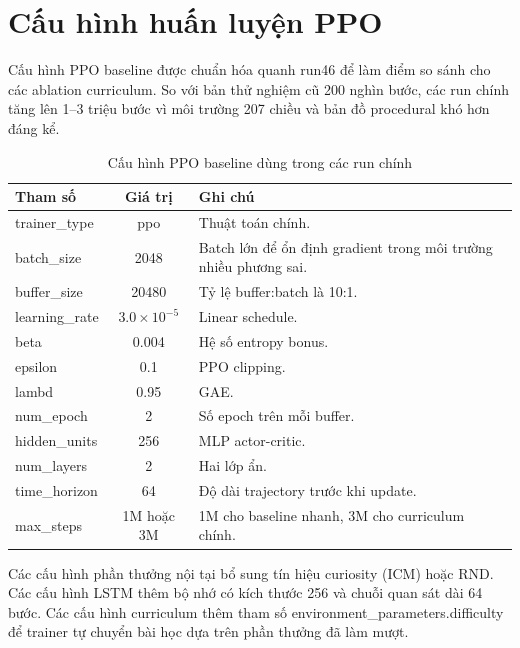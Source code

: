 \section{Cấu hình huấn luyện PPO}

Cấu hình PPO baseline được chuẩn hóa quanh run46 để làm điểm so sánh cho các ablation curriculum. So với bản thử nghiệm cũ 200 nghìn bước, các run chính tăng lên 1--3 triệu bước vì môi trường 207 chiều và bản đồ procedural khó hơn đáng kể.

\begin{table}[H]
    \centering
    \small
    \caption{Cấu hình PPO baseline dùng trong các run chính}
    \label{tab:ppo_baseline_config}
    \begin{tabular}{|p{4cm}|c|p{7cm}|}
        \hline
        \textbf{Tham số} & \textbf{Giá trị} & \textbf{Ghi chú} \\
        \hline
        trainer\_type & ppo & Thuật toán chính. \\
        \hline
        batch\_size & 2048 & Batch lớn để ổn định gradient trong môi trường nhiều phương sai. \\
        \hline
        buffer\_size & 20480 & Tỷ lệ buffer:batch là 10:1. \\
        \hline
        learning\_rate & $3.0 \times 10^{-5}$ & Linear schedule. \\
        \hline
        beta & 0.004 & Hệ số entropy bonus. \\
        \hline
        epsilon & 0.1 & PPO clipping. \\
        \hline
        lambd & 0.95 & GAE. \\
        \hline
        num\_epoch & 2 & Số epoch trên mỗi buffer. \\
        \hline
        hidden\_units & 256 & MLP actor-critic. \\
        \hline
        num\_layers & 2 & Hai lớp ẩn. \\
        \hline
        time\_horizon & 64 & Độ dài trajectory trước khi update. \\
        \hline
        max\_steps & 1M hoặc 3M & 1M cho baseline nhanh, 3M cho curriculum chính. \\
        \hline
    \end{tabular}
\end{table}

Các cấu hình phần thưởng nội tại bổ sung tín hiệu curiosity (ICM) hoặc RND. Các cấu hình LSTM thêm bộ nhớ có kích thước 256 và chuỗi quan sát dài 64 bước. Các cấu hình curriculum thêm tham số environment\_parameters.difficulty để trainer tự chuyển bài học dựa trên phần thưởng đã làm mượt.

